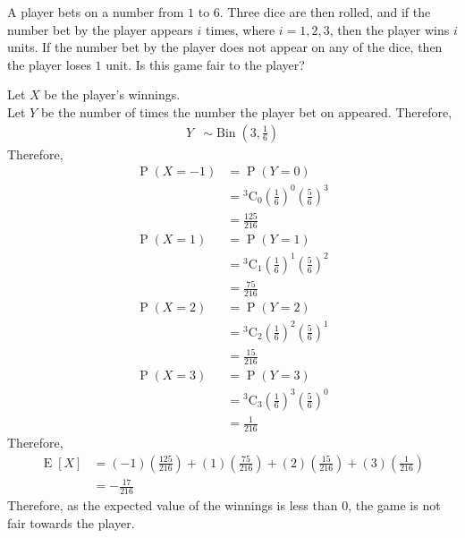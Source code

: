 \documentclass[fleqn, a4paper, 11pt, oneside]{amsart}
\theoremstyle{definition}
\theoremstyle{theorem}
\DeclareMathOperator{\prob}{\mathrm{P}}
\DeclareMathOperator{\expct}{\mathrm{E}}
\DeclareMathOperator{\bin}{\mathrm{Bin}}
\newcommand*{\comb}[2]{{}^{#1}\mathrm{C}_{#2}}%
\begin{document}
\begin{question}
	A player bets on a number from $1$ to $6$.
	Three dice are then rolled, and if the number bet by the player appears $i$ times, where $i = 1,2,3$, then the player wins $i$ units.
	If the number bet by the player does not appear on any of the dice, then the player loses $1$ unit.
	Is this game fair to the player?
\end{question}

\begin{solution}
	Let $X$ be the player's winnings.\\
	Let $Y$ be the number of times the number the player bet on appeared.
	Therefore,
	\begin{align*}
		Y & \sim \bin\left( 3,\frac{1}{6} \right)
	\end{align*}
	Therefore,
	\begin{align*}
		\prob(X = -1) & = \prob(Y = 0)                                                          \\
                              & = \comb{3}{0} \left( \frac{1}{6} \right)^0 \left( \frac{5}{6} \right)^3 \\
                              & = \frac{125}{216}                                                       \\
		\prob(X = 1)  & = \prob(Y = 1)                                                          \\
                              & = \comb{3}{1} \left( \frac{1}{6} \right)^1 \left( \frac{5}{6} \right)^2 \\
                              & = \frac{75}{216}                                                        \\
		\prob(X = 2)  & = \prob(Y = 2)                                                          \\
                              & = \comb{3}{2} \left( \frac{1}{6} \right)^2 \left( \frac{5}{6} \right)^1 \\
                              & = \frac{15}{216}                                                        \\
		\prob(X = 3)  & = \prob(Y = 3)                                                          \\
                              & = \comb{3}{3} \left( \frac{1}{6} \right)^3 \left( \frac{5}{6} \right)^0 \\
                              & = \frac{1}{216}
	\end{align*}
	Therefore,
	\begin{align*}
		\expct[X] & = (-1) \left( \frac{125}{216} \right) + (1) \left( \frac{75}{216} \right) + (2) \left( \frac{15}{216} \right) + (3) \left( \frac{1}{216} \right) \\
                          & = -\frac{17}{216}
	\end{align*}
	Therefore, as the expected value of the winnings is less than $0$, the game is not fair towards the player.
\end{solution}
\end{document}
